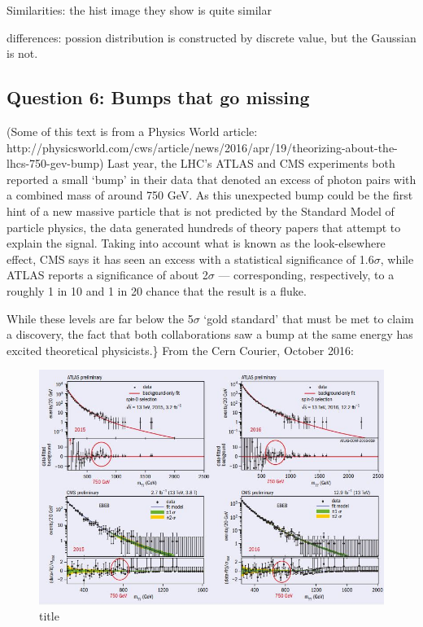 \documentclass[11pt]{article}
\makeatletter
\def\maxwidth{\ifdim\Gin@nat@width>\linewidth\linewidth
    \else\Gin@nat@width\fi}
\let\Oldincludegraphics\includegraphics
\renewcommand{\includegraphics}[1]{\Oldincludegraphics[width=.8\maxwidth]{#1}}
\makeatother
\begin{document}
    Similarities: the hist image they show is quite similar

differences: possion distribution is constructed by discrete value, but
the Gaussian is not.

    \hypertarget{question-6-bumps-that-go-missing}{%
\subsection{Question 6: Bumps that go
missing}\label{question-6-bumps-that-go-missing}}

(Some of this text is from a Physics World article:
http://physicsworld.com/cws/article/news/2016/apr/19/theorizing-about-the-lhcs-750-gev-bump)
Last year, the LHC's ATLAS and CMS experiments both reported a small
`bump' in their data that denoted an excess of photon pairs with a
combined mass of around 750 GeV. As this unexpected bump could be the
first hint of a new massive particle that is not predicted by the
Standard Model of particle physics, the data generated hundreds of
theory papers that attempt to explain the signal. Taking into account
what is known as the look-elsewhere effect, CMS says it has seen an
excess with a statistical significance of 1.6\(\sigma\), while ATLAS
reports a significance of about 2\(\sigma\) --- corresponding,
respectively, to a roughly 1 in 10 and 1 in 20 chance that the result is
a fluke.

While these levels are far below the 5\(\sigma\) `gold standard' that
must be met to claim a discovery, the fact that both collaborations saw
a bump at the same energy has excited theoretical physicists.\} From the
Cern Courier, October 2016:

\begin{figure}
\centering
\includegraphics{figure_1A.JPG}
\caption{title}
\end{figure}
\end{document}
